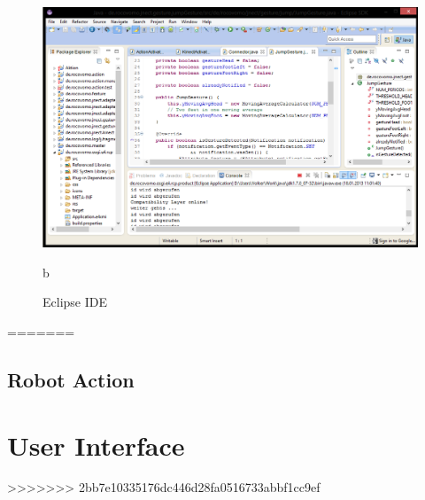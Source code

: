 \begin{figure}[htb]
\centering
\includegraphics[width=1\textwidth]{img/09kapitel/rcp.png}
\caption[Eclipse IDE]{Eclipse IDE}
\label{fig:eclipse}b
\end{figure}

=======

\subsection{Robot Action}

\section{User Interface}

>>>>>>> 2bb7e10335176dc446d28fa0516733abbf1cc9ef
